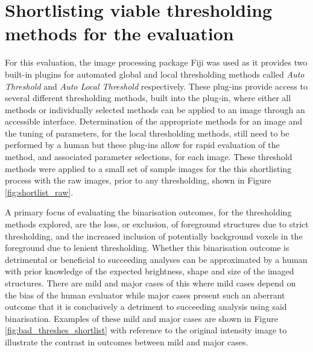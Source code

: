 \section{Shortlisting viable thresholding methods for the evaluation}
For this evaluation, the image processing package Fiji was used as it provides two built-in plugins for automated global and local thresholding methods called \textit{Auto Threshold} and \textit{Auto Local Threshold} respectively. These plug-ins provide access to several different thresholding methods, built into the plug-in, where either all methods or individually selected methods can be applied to an image through an accessible interface. Determination of the appropriate methods for an image and the tuning of parameters, for the local thresholding methods, still need to be performed by a human but these plug-ins allow for rapid evaluation of the method, and associated parameter selections, for each image. These threshold methods were applied to a small set of sample images for the this shortlisting process with the raw images, prior to any thresholding, shown in Figure \ref{fig:shortlist_raw}.\par 
A primary focus of evaluating the binarisation outcomes, for the thresholding methods explored, are the loss, or exclusion, of foreground structures due to strict thresholding, and the increased inclusion of potentially background voxels in the foreground due to lenient thresholding. Whether this binarisation outcome is detrimental or beneficial to succeeding analyses can be approximated by a human with prior knowledge of the expected brightness, shape and size of the imaged structures. There are mild and major cases of this where mild cases depend on the bias of the human evaluator while major cases present such an aberrant outcome that it is conclusively a detriment to succeeding analysis using said binarisation. Examples of these mild and major cases are shown in Figure \ref{fig:bad_threshes_shortlist} with reference to the original intensity image to illustrate the contrast in outcomes between mild and major cases.

